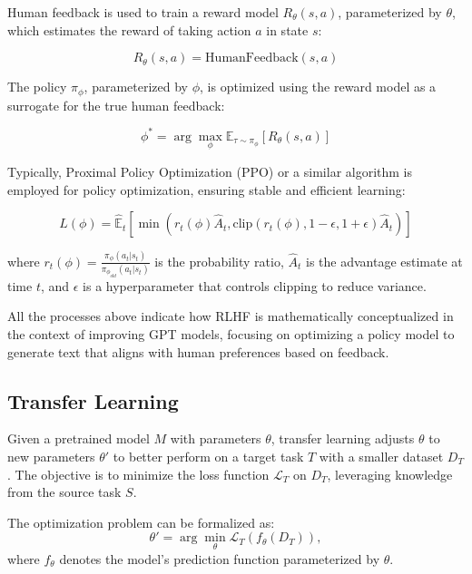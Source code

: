 \documentclass[11pt,a4paper,oneside]{report}
\begin{document}
Human feedback is used to train a reward model $R_{\theta}(s,a)$, parameterized by $\theta$, which estimates the reward of taking action $a$ in state $s$:

\begin{equation}
R_{\theta}(s,a) = \text{HumanFeedback}(s, a)
\end{equation}

The policy $\pi_{\phi}$, parameterized by $\phi$, is optimized using the reward model as a surrogate for the true human feedback:

\begin{equation}
\phi^{*} = \arg\max_{\phi} \mathbb{E}_{\tau \sim \pi_{\phi}} [R_{\theta}(s,a)]
\end{equation}

Typically, Proximal Policy Optimization (PPO) or a similar algorithm is employed for policy optimization, ensuring stable and efficient learning:

\begin{equation}
L(\phi) = \hat{\mathbb{E}}_t \left[ \min(r_t(\phi) \hat{A}_t, \text{clip}(r_t(\phi), 1-\epsilon, 1+\epsilon) \hat{A}_t) \right]
\end{equation}

where $r_t(\phi) = \frac{\pi_{\phi}(a_t|s_t)}{\pi_{\phi_{old}}(a_t|s_t)}$ is the probability ratio, $\hat{A}_t$ is the advantage estimate at time $t$, and $\epsilon$ is a hyperparameter that controls clipping to reduce variance.

All the processes above indicate how RLHF is mathematically conceptualized in the context of improving GPT models, focusing on optimizing a policy model to generate text that aligns with human preferences based on feedback.

\subsection{Transfer Learning}
Given a pretrained model \(M\) with parameters \(\theta\), transfer learning \cite{torrey2010transfer} adjusts \(\theta\) to new parameters \(\theta'\) to better perform on a target task \(T\) with a smaller dataset \(D_{T}\). The objective is to minimize the loss function \(\mathcal{L}_{T}\) on \(D_{T}\), leveraging knowledge from the source task \(S\).

The optimization problem can be formalized as:
\[
\theta' = \arg\min_{\theta} \mathcal{L}_{T}(f_{\theta}(D_{T})),
\]
where \(f_{\theta}\) denotes the model's prediction function parameterized by \(\theta\).
\end{document}
